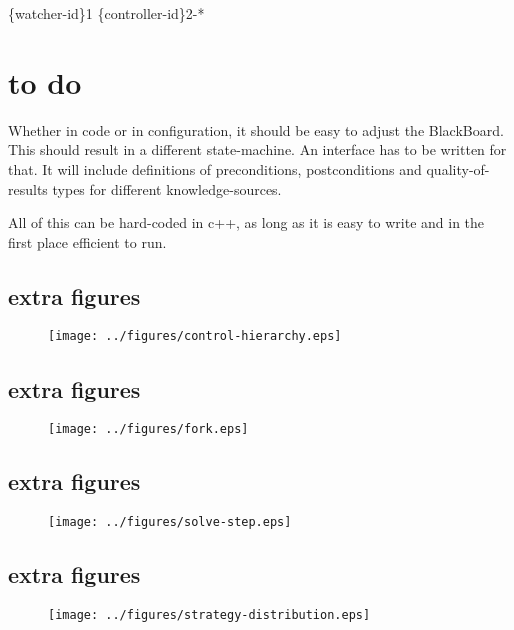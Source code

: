 \documentclass[]{lofar}
\begin{document}
        \{watcher-id\}1 \{controller-id\}2-*

  \section{to do}
  \label{sec:todo}\hypertarget{sec:todo}{}

    Whether in code or in configuration, it should be easy to adjust
    the BlackBoard. This should result in a different
    state-machine. An interface has to be written for that. It will
    include definitions of preconditions, postconditions and
    quality-of-results types for different knowledge-sources.

    All of this can be hard-coded in c++, as long as it is easy to
    write and in the first place efficient to run.

    \subsection{extra figures}
    \begin{figure}
      \texttt{[image: ../figures/control-hierarchy.eps]}
    \end{figure}

    \subsection{extra figures}
    \begin{figure}
      \texttt{[image: ../figures/fork.eps]}
    \end{figure}

    \subsection{extra figures}
    \begin{figure}
      \texttt{[image: ../figures/solve-step.eps]}
    \end{figure}

    \subsection{extra figures}
    \begin{figure}
      \texttt{[image: ../figures/strategy-distribution.eps]}
    \end{figure}

\newcommand{\dbappendix}[1]{\section{#1}}%
\end{document}
